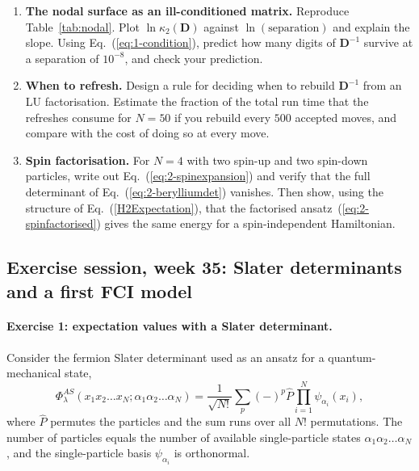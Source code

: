 \begin{enumerate}
\item \textbf{The nodal surface as an ill-conditioned matrix.}
  Reproduce Table~\ref{tab:nodal}.  Plot $\ln\kappa_2(\bm{D})$ against
  $\ln(\text{separation})$ and explain the slope.  Using
  Eq.~(\ref{eq:1-condition}), predict how many digits of $\bm{D}^{-1}$
  survive at a separation of $10^{-8}$, and check your prediction.

\item \textbf{When to refresh.}
  Design a rule for deciding when to rebuild $\bm{D}^{-1}$ from an LU
  factorisation.  Estimate the fraction of the total run time that the
  refreshes consume for $N=50$ if you rebuild every $500$ accepted moves,
  and compare with the cost of doing so at every move.

\item \textbf{Spin factorisation.}
  For $N=4$ with two spin-up and two spin-down particles, write out
  Eq.~(\ref{eq:2-spinexpansion}) and verify that the full determinant of
  Eq.~(\ref{eq:2-berylliumdet}) vanishes.  Then show, using the structure of
  Eq.~(\ref{H2Expectation}), that the factorised
  ansatz~(\ref{eq:2-spinfactorised}) gives the same energy for a
  spin-independent Hamiltonian.

\end{enumerate}

\subsection*{Exercise session, week 35: Slater determinants and a first FCI model}

\paragraph{Exercise 1: expectation values with a Slater determinant.}
Consider the fermion Slater determinant used as an ansatz for a
quantum-mechanical state,
\begin{equation}
  \Phi_{\lambda}^{AS}(x_1x_2\dots x_N;\alpha_1\alpha_2\dots\alpha_N)
   = \frac{1}{\sqrt{N!}}\sum_{p}(-)^{p}\hat{P}\prod_{i=1}^{N}
     \psi_{\alpha_i}(x_i),
  \label{eq:2-w35SD}
\end{equation}
where $\hat{P}$ permutes the particles and the sum runs over all $N!$
permutations.  The number of particles equals the number of available
single-particle states $\alpha_1\alpha_2\dots\alpha_N$, and the
single-particle basis $\psi_{\alpha_i}$ is orthonormal.

